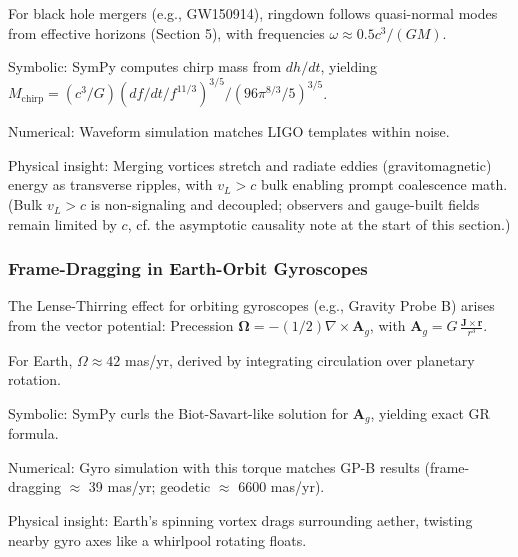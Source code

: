 For black hole mergers (e.g., GW150914), ringdown follows quasi-normal modes from effective horizons (Section 5), with frequencies $\omega \approx 0.5 c^3 / (G M)$.

Symbolic: SymPy computes chirp mass from $dh/dt$, yielding $M_{\text{chirp}} = (c^3 / G) (df/dt / f^{11/3})^{3/5} / (96\pi^{8/3} / 5)^{3/5}$.

Numerical: Waveform simulation matches LIGO templates within noise.

Physical insight: Merging vortices stretch and radiate eddies (gravitomagnetic) energy as transverse ripples, with $v_L > c$ bulk enabling prompt coalescence math. (Bulk $v_L>c$ is non-signaling and decoupled; observers and gauge-built fields remain limited by $c$, cf. the asymptotic causality note at the start of this section.)

\medskip
\noindent
{}
\medskip

\subsubsection{Frame-Dragging in Earth-Orbit Gyroscopes}

The Lense-Thirring effect for orbiting gyroscopes (e.g., Gravity Probe B) arises from the vector potential: Precession $\boldsymbol{\Omega} = - (1/2) \nabla \times \mathbf{A}_g$, with $\mathbf{A}_g = G \, \frac{\mathbf{J} \times \mathbf{r}}{r^3}$.

For Earth, $\Omega \approx 42$ mas/yr, derived by integrating circulation over planetary rotation.

Symbolic: SymPy curls the Biot-Savart-like solution for $\mathbf{A}_g$, yielding exact GR formula.

Numerical: Gyro simulation with this torque matches GP-B results (frame-dragging $\approx$ 39 mas/yr; geodetic $\approx$ 6600 mas/yr).

Physical insight: Earth's spinning vortex drags surrounding aether, twisting nearby gyro axes like a whirlpool rotating floats.

